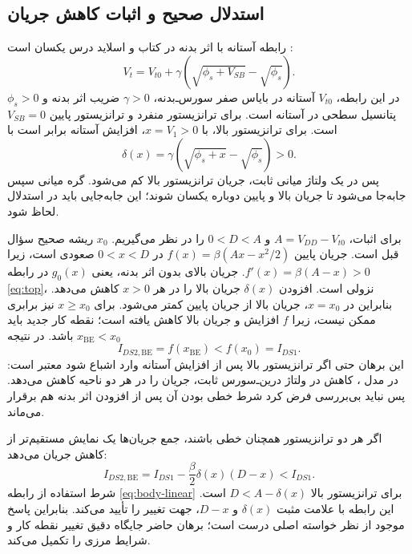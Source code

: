 \documentclass[12pt,a4paper]{article}
\newcommand{\exnum}[1]{\mbox{\beginL#1\endL}}
\begin{document}
\subsection*{استدلال صحیح و اثبات کاهش جریان}
رابطه آستانه با اثر بدنه در کتاب و اسلاید درس یکسان است \cite[بخش \exnum{۲.۴.۳.۱}، صفحه چاپی ۷۹، صفحه ۱۰۶ فایل]{weste}\cite[اسلایدهای ۱۶ و ۱۷]{nonideal}:
\begin{equation}
 V_t=V_{t0}+\gamma\left(\sqrt{\phi_s+V_{SB}}-\sqrt{\phi_s}\right).
 \label{eq:body}
\end{equation}
در این رابطه، \(V_{t0}\) آستانه در بایاس صفر سورس‌ـ‌بدنه، \(\gamma>0\) ضریب اثر بدنه و \(\phi_s>0\) پتانسیل سطحی در آستانه است. برای ترانزیستور منفرد و ترانزیستور پایین \(V_{SB}=0\) است. برای ترانزیستور بالا، با \(x=V_1>0\)، افزایش آستانه برابر است با
\begin{equation}
 \delta(x)=\gamma\left(\sqrt{\phi_s+x}-\sqrt{\phi_s}\right)>0.
 \label{eq:delta-body}
\end{equation}
پس در یک ولتاژ میانی ثابت، جریان ترانزیستور بالا کم می‌شود. گره میانی سپس جابه‌جا می‌شود تا جریان بالا و پایین دوباره یکسان شوند؛ این جابه‌جایی باید در استدلال لحاظ شود.

برای اثبات، \(A=V_{DD}-V_{t0}\) و \(0<D<A\) را در نظر می‌گیریم. \(x_0\) ریشه صحیح سؤال قبل است. جریان پایین \(f(x)=\beta(Ax-x^2/2)\) در \(0<x<D\) صعودی است، زیرا \(f'(x)=\beta(A-x)>0\). جریان بالای بدون اثر بدنه، یعنی \(g_0(x)\) در رابطه \eqref{eq:top}، نزولی است. افزودن \(\delta(x)\) جریان بالا را در هر \(x>0\) کاهش می‌دهد. بنابراین در \(x=x_0\)، جریان بالا از جریان پایین کمتر می‌شود. برای \(x\ge x_0\) نیز برابری ممکن نیست، زیرا \(f\) افزایش و جریان بالا کاهش یافته است؛ نقطه کار جدید باید \(x_{\mathrm{BE}}<x_0\) باشد. در نتیجه
\begin{equation}
 I_{DS2,\mathrm{BE}}=f(x_{\mathrm{BE}})<f(x_0)=I_{DS1}.
 \label{eq:body-inequality}
\end{equation}
این برهان حتی اگر ترانزیستور بالا پس از افزایش آستانه وارد اشباع شود معتبر است: در مدل ، کاهش  در ولتاژ درین‌ـ‌سورس ثابت، جریان را در هر دو ناحیه کاهش می‌دهد. پس نباید بی‌بررسی فرض کرد شرط خطی بودن آن پس از افزودن اثر بدنه هم برقرار می‌ماند.

اگر هر دو ترانزیستور همچنان خطی باشند، جمع جریان‌ها یک نمایش مستقیم‌تر از کاهش جریان می‌دهد:
\begin{equation}
 I_{DS2,\mathrm{BE}}=I_{DS1}-\frac{\beta}{2}\delta(x)(D-x)<I_{DS1}.
 \label{eq:body-linear}
\end{equation}
شرط استفاده از رابطه \eqref{eq:body-linear} برای ترانزیستور بالا \(D<A-\delta(x)\) است. این رابطه با علامت مثبت \(\delta(x)\) و \(D-x\)، جهت تغییر را تأیید می‌کند. بنابراین پاسخ موجود از نظر خواسته اصلی درست است؛ برهان حاضر جایگاه دقیق تغییر نقطه کار و شرایط مرزی را تکمیل می‌کند.
\end{document}
